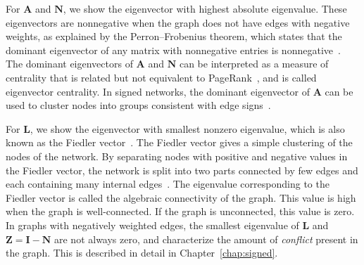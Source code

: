 \documentclass[11pt,a4paper]{book}
\begin{document}
For $\mathbf A$ and $\mathbf N$, we show the eigenvector
with highest absolute eigenvalue.  These eigenvectors are nonnegative
when the graph does not have edges with negative weights,
as explained by the Perron--Frobenius theorem, which states that the
dominant eigenvector of any matrix with nonnegative entries is
nonnegative~\cite{b658}.
The dominant eigenvectors of $\mathbf A$ and $\mathbf N$ can be interpreted as a
measure of centrality that is related but not equivalent to
PageRank~\cite{b659}, and is called eigenvector centrality. 
In signed networks, the dominant eigenvector of $\mathbf A$ can be used
to cluster nodes into groups consistent with edge signs~\cite{b661}. 

For $\mathbf L$, we show the eigenvector with smallest
nonzero eigenvalue, which is also known as the Fiedler
vector~\cite{b652}.  
The Fiedler vector gives a simple clustering of the nodes of the
network.  By separating nodes with positive and negative values in the
Fiedler vector, the network is split into two parts connected by few
edges and each containing many internal
edges~\cite{b304}.  
The eigenvalue corresponding to the Fiedler vector is called the
algebraic connectivity of the graph.  This value is high when the graph
is well-connected.  If the graph is unconnected, this value is
zero. 
In graphs with negatively weighted edges, the smallest eigenvalue of
$\mathbf L$ and $\mathbf Z = \mathbf I - \mathbf N$ are not always zero,
and characterize the amount of \emph{conflict} present in the graph.
This is described in detail in Chapter~\ref{chap:signed}. 
\end{document}
